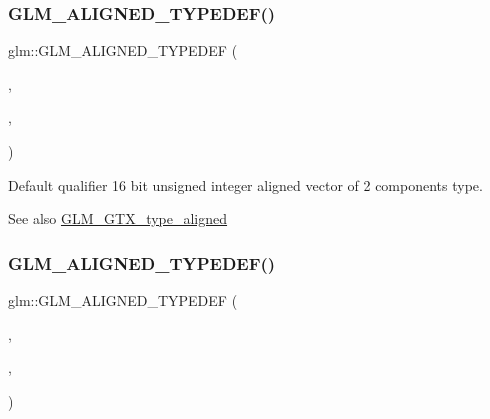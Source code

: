\subsubsection{\texorpdfstring{G\+L\+M\+\_\+\+A\+L\+I\+G\+N\+E\+D\+\_\+\+T\+Y\+P\+E\+D\+E\+F()}{GLM\_ALIGNED\_TYPEDEF()}\hspace{0.1cm}{\footnotesize\ttfamily [126/209]}}
{\footnotesize\ttfamily glm\+::\+G\+L\+M\+\_\+\+A\+L\+I\+G\+N\+E\+D\+\_\+\+T\+Y\+P\+E\+D\+EF (\begin{DoxyParamCaption}\item[{\mbox{\hyperlink{group__gtc__type__precision_ga50bd2ceeb100a187e7c46f135269a0ec}{u16vec2}}}]{,  }\item[{aligned\+\_\+u16vec2}]{,  }\item[{4}]{ }\end{DoxyParamCaption})}

Default qualifier 16 bit unsigned integer aligned vector of 2 components type. \begin{DoxySeeAlso}{See also}
\mbox{\hyperlink{group__gtx__type__aligned}{G\+L\+M\+\_\+\+G\+T\+X\+\_\+type\+\_\+aligned}} 
\end{DoxySeeAlso}
\mbox{\label{group__gtx__type__aligned_ga09540dbca093793a36a8997e0d4bee77}} 
\subsubsection{\texorpdfstring{G\+L\+M\+\_\+\+A\+L\+I\+G\+N\+E\+D\+\_\+\+T\+Y\+P\+E\+D\+E\+F()}{GLM\_ALIGNED\_TYPEDEF()}\hspace{0.1cm}{\footnotesize\ttfamily [127/209]}}
{\footnotesize\ttfamily glm\+::\+G\+L\+M\+\_\+\+A\+L\+I\+G\+N\+E\+D\+\_\+\+T\+Y\+P\+E\+D\+EF (\begin{DoxyParamCaption}\item[{\mbox{\hyperlink{group__gtc__type__precision_gad60f14d1abd39b480cbe5c5cf848071a}{u16vec3}}}]{,  }\item[{aligned\+\_\+u16vec3}]{,  }\item[{8}]{ }\end{DoxyParamCaption})}

